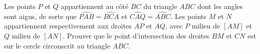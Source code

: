 Les points $P$ et $Q$ appartiennent au côté $BC$ du triangle $ABC$ dont les angles sont aigus, de sorte que
$\widehat{PAB} = \widehat{BCA}$ et $\widehat{CAQ} = \widehat{ABC}$. Les points $M$ et $N$ appartiennent
respectivement aux droites $AP$ et $AQ$, avec $P$ milieu de $[AM]$ et $Q$ milieu de $[AN]$. Prouver que le
point d'intersection des droites $BM$ et $CN$ est sur le cercle circonscrit au triangle $ABC$.
